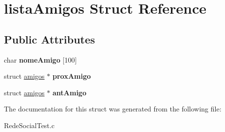 \hypertarget{structlistaAmigos}{}\section{lista\+Amigos Struct Reference}
\label{structlistaAmigos}
\subsection*{Public Attributes}
\begin{DoxyCompactItemize}
\item 
\mbox{\label{structlistaAmigos_a3e3ad4f7f28717446b4d9186780f5a92}} 
char {\bfseries nome\+Amigo} \mbox{[}100\mbox{]}
\item 
\mbox{\label{structlistaAmigos_a1666fad37f4d0f5c31534af610d14d86}} 
struct \hyperlink{structamigos}{amigos} $\ast$ {\bfseries prox\+Amigo}
\item 
\mbox{\label{structlistaAmigos_a4a2ad2748497a6b00874ed16341e4c6e}} 
struct \hyperlink{structamigos}{amigos} $\ast$ {\bfseries ant\+Amigo}
\end{DoxyCompactItemize}


The documentation for this struct was generated from the following file\+:\begin{DoxyCompactItemize}
\item 
Rede\+Social\+Test.\+c\end{DoxyCompactItemize}

